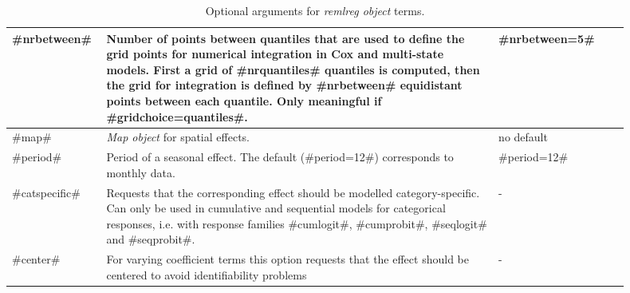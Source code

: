 \begin{table}[ht]
\begin{tabular}{|p{0.1\linewidth}|p{0.6\linewidth}|p{0.2\linewidth}|}
 \hline
 #nrbetween# & Number of points between quantiles that are used to define the grid points for numerical integration in Cox and multi-state models. First a grid of #nrquantiles# quantiles is computed, then the grid for integration is defined by #nrbetween# equidistant points between each quantile. Only meaningful if #gridchoice=quantiles#.& #nrbetween=5#\\
 \hline
 #map# & {\em Map object} for spatial effects. & no default\\
 \hline
 #period# & Period of a seasonal effect. The default (#period=12#) corresponds to monthly data. & #period=12# \\
 \hline
 #catspecific# & Requests that the corresponding effect should be modelled category-specific. Can only be used in cumulative and sequential models for categorical responses, i.e. with response families #cumlogit#, #cumprobit#, #seqlogit# and #seqprobit#. & - \\
 \hline
 #center# & For varying coefficient terms this option requests that the effect should be centered to avoid identifiability problems& - \\
 \hline
\end{tabular}
{\em \caption{\label{remlregoptions} Optional arguments for {\em
remlreg object} terms.}}
\end{table}

